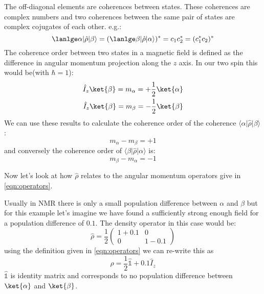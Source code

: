 The off-diagonal elements are coherences between states. These coherences are complex numbers and two coherences between the same pair of states are complex cojugates of each other. e.g.:
\begin{equation}
  \lanlge\alpha\vert\hat\rho\vert\beta\rangle = (\lanlge\beta\vert\hat\rho\vert\alpha\rangle)^* = c_1c_2^* = (c_1^*c_2)^*
\end{equation}
The coherence order between two states in a magnetic field is defined as the difference in angular
momentum projection along the $z$ axis. In our two spin this would be(with $\hbar = 1$):
\begin{equation}
\begin{align}
  \hat{I}_z\ket{\beta} = m_\alpha = +\frac{1}{2}\ket{\alpha}\\
  \hat{I}_z\ket{\beta} = m_\beta = -\frac{1}{2}\ket{\beta}
\end{align}
\end{equation}
We can use these results to calculate the coherence order of the coherence $\langle\alpha\vert\hat\rho\vert\beta\rangle$:
\begin{equation}
 m_\alpha - m_\beta = +1
\end{equation}
and conversely the coherence order of $\langle\beta\vert\hat\rho\vert\alpha\rangle$ is:
\begin{equation}
  m_\beta - m_\alpha = -1
\end{equation}

Now let's look at how $\hat\rho$ relates to the angular momentum operators give in \ref{eqn:operators}.

Usually in NMR there is only a small population difference between $\alpha$ and $\beta$
but for this example let's imagine we have found a sufficiently strong enough field for a population difference of $0.1$. The density operator in this case would be:
\begin{equation}
  \hat\rho = \frac{1}{2}\begin{pmatrix}
    1 + 0.1 & 0\\
    0 & 1-0.1
\end{pmatrix}
\end{equation}
using the definition given in \ref{eqn:operators} we can re-write this as
\begin{equation}
  \hat\rho = \frac{1}{2}\hat{\mathbb{1}} + 0.1\hat{I}_z
\end{equation}
$\hat{\mathbb{1}}$ is identity matrix and corresponds to no population difference between $\ket{\alpha}$ and $\ket{\beta}$.

